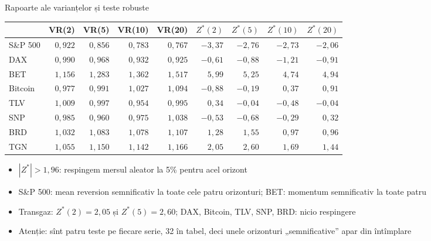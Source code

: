 \begin{frame}{Rapoarte ale varianțelor și teste robuste}
\itemsize{\footnotesize}
\begin{center}
\scriptsize
\begin{tabular}{lrrrrrrrr}
\toprule
& VR(2) & VR(5) & VR(10) & VR(20) & $Z^*(2)$ & $Z^*(5)$ & $Z^*(10)$ & $Z^*(20)$ \\
\midrule
S\&P 500 & $0{,}922$ & $0{,}856$ & $0{,}783$ & $0{,}767$ & ${-3{,}37}$ & ${-2{,}76}$ & ${-2{,}73}$ & ${-2{,}06}$ \\
DAX & $0{,}990$ & $0{,}968$ & $0{,}932$ & $0{,}925$ & ${-0{,}61}$ & ${-0{,}88}$ & ${-1{,}21}$ & ${-0{,}91}$ \\
BET & $1{,}156$ & $1{,}283$ & $1{,}362$ & $1{,}517$ & ${5{,}99}$ & ${5{,}25}$ & ${4{,}74}$ & ${4{,}94}$ \\
Bitcoin & $0{,}977$ & $0{,}991$ & $1{,}027$ & $1{,}094$ & ${-0{,}88}$ & ${-0{,}19}$ & ${0{,}37}$ & ${0{,}91}$ \\
TLV & $1{,}009$ & $0{,}997$ & $0{,}954$ & $0{,}995$ & ${0{,}34}$ & ${-0{,}04}$ & ${-0{,}48}$ & ${-0{,}04}$ \\
SNP & $0{,}985$ & $0{,}960$ & $0{,}975$ & $1{,}038$ & ${-0{,}53}$ & ${-0{,}68}$ & ${-0{,}29}$ & ${0{,}32}$ \\
BRD & $1{,}032$ & $1{,}083$ & $1{,}078$ & $1{,}107$ & ${1{,}28}$ & ${1{,}55}$ & ${0{,}97}$ & ${0{,}96}$ \\
TGN & $1{,}055$ & $1{,}150$ & $1{,}142$ & $1{,}166$ & ${2{,}05}$ & ${2{,}60}$ & ${1{,}69}$ & ${1{,}44}$ \\
\bottomrule
\end{tabular}
\end{center}
\begin{itemize}
    \item $|Z^*| > 1{,}96$: respingem mersul aleator la 5\% pentru acel orizont
    \item S\&P 500: mean reversion semnificativ la toate cele patru orizonturi; BET: momentum semnificativ la toate patru
    \item Transgaz: $Z^*(2) = 2{,}05$ și $Z^*(5) = 2{,}60$; DAX, Bitcoin, TLV, SNP, BRD: nicio respingere
    \item Atenție: sînt patru teste pe fiecare serie, 32 în tabel, deci unele orizonturi „semnificative” apar din întîmplare
\end{itemize}
\end{frame}


